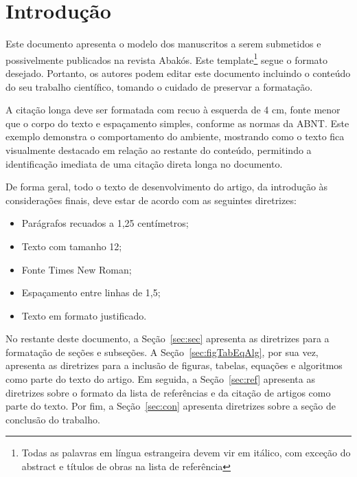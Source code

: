 \documentclass[a4paper,12pt]{article}
\begin{document}
	
	
	\revistaheader
	\newpage
	
	\onehalfspace  %
	\setlength{\parindent}{1.25cm}
	
	
	\section{Introdução}
	
	Este documento apresenta o modelo dos manuscritos a serem submetidos e possivelmente publicados na revista Abakós. Este template\footnote{Todas as palavras em língua estrangeira devem vir em itálico, com exceção do abstract e títulos de obras na lista de referência} segue o formato desejado. Portanto, os autores podem editar este documento incluindo o conteúdo do seu trabalho científico, tomando o cuidado de preservar a formatação.
	
	\begin{citacao}
		A citação longa deve ser formatada com recuo à esquerda de 4 cm,
		fonte menor que o corpo do texto e espaçamento simples, conforme as
		normas da ABNT. Este exemplo demonstra o comportamento do ambiente,
		mostrando como o texto fica visualmente destacado em relação ao
		restante do conteúdo, permitindo a identificação imediata de uma
		citação direta longa no documento.
	\end{citacao}
	
	De forma geral, todo o texto de desenvolvimento do artigo, da introdução às considerações finais, deve estar de acordo com as seguintes diretrizes:
	\begin{itemize}
		\item Parágrafos recuados a 1,25 centímetros;
		\item Texto com tamanho 12;
		\item Fonte Times New Roman;
		\item Espaçamento entre linhas de 1,5;
		\item Texto em formato justificado.
	\end{itemize}
	
	No restante deste documento, a Seção~\ref{sec:sec} apresenta as diretrizes para a formatação de seções e subseções. A Seção~\ref{sec:figTabEqAlg}, por sua vez, apresenta as diretrizes para a inclusão de figuras, tabelas, equações e algoritmos como parte do texto do artigo. Em seguida, a Seção~\ref{sec:ref} apresenta as diretrizes sobre o formato da lista de referências e da citação de artigos como parte do texto. Por fim, a Seção~\ref{sec:con} apresenta diretrizes sobre a seção de conclusão do trabalho.
	
\end{document}
